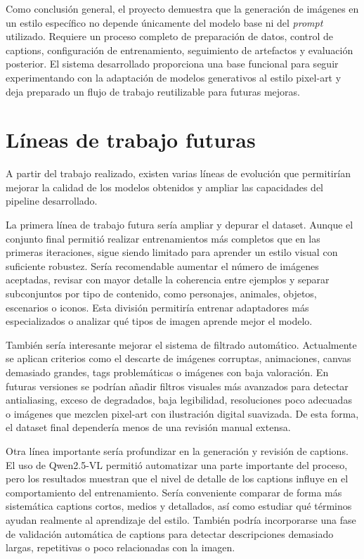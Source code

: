 \documentclass[a4paper,11pt,titlepage]{scrbook}
\begin{document}
\medskip

Como conclusión general, el proyecto demuestra que la generación de imágenes en un estilo específico no depende únicamente del modelo base ni del \textit{prompt} utilizado. Requiere un proceso completo de preparación de datos, control de captions, configuración de entrenamiento, seguimiento de artefactos y evaluación posterior. El sistema desarrollado proporciona una base funcional para seguir experimentando con la adaptación de modelos generativos al estilo pixel-art y deja preparado un flujo de trabajo reutilizable para futuras mejoras.

\section{Líneas de trabajo futuras}
\label{futuro}

A partir del trabajo realizado, existen varias líneas de evolución que permitirían mejorar la calidad de los modelos obtenidos y ampliar las capacidades del pipeline desarrollado.

\medskip

La primera línea de trabajo futura sería ampliar y depurar el dataset. Aunque el conjunto final permitió realizar entrenamientos más completos que en las primeras iteraciones, sigue siendo limitado para aprender un estilo visual con suficiente robustez. Sería recomendable aumentar el número de imágenes aceptadas, revisar con mayor detalle la coherencia entre ejemplos y separar subconjuntos por tipo de contenido, como personajes, animales, objetos, escenarios o iconos. Esta división permitiría entrenar adaptadores más especializados o analizar qué tipos de imagen aprende mejor el modelo.

\medskip

También sería interesante mejorar el sistema de filtrado automático. Actualmente se aplican criterios como el descarte de imágenes corruptas, animaciones, canvas demasiado grandes, tags problemáticas o imágenes con baja valoración. En futuras versiones se podrían añadir filtros visuales más avanzados para detectar antialiasing, exceso de degradados, baja legibilidad, resoluciones poco adecuadas o imágenes que mezclen pixel-art con ilustración digital suavizada. De esta forma, el dataset final dependería menos de una revisión manual extensa.

\medskip

Otra línea importante sería profundizar en la generación y revisión de captions. El uso de Qwen2.5-VL permitió automatizar una parte importante del proceso, pero los resultados muestran que el nivel de detalle de los captions influye en el comportamiento del entrenamiento. Sería conveniente comparar de forma más sistemática captions cortos, medios y detallados, así como estudiar qué términos ayudan realmente al aprendizaje del estilo. También podría incorporarse una fase de validación automática de captions para detectar descripciones demasiado largas, repetitivas o poco relacionadas con la imagen.
\end{document}
